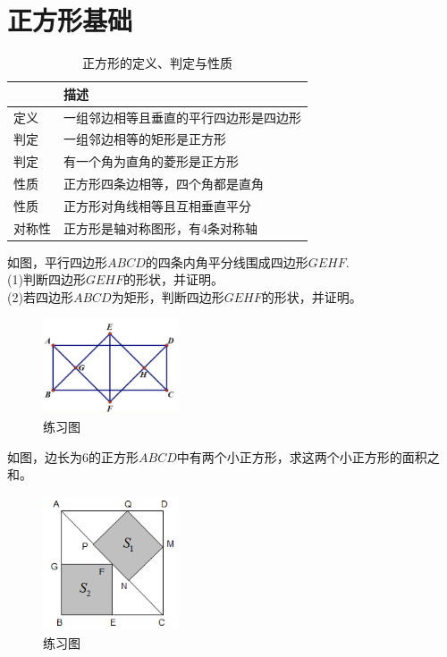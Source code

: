 \documentclass{ecnuthesis}
\begin{document}
\section{正方形基础}
\begin{table}[H]
\centering
\caption{正方形的定义、判定与性质}
\begin{tabular}{|l|l|}
\hline
    & 描述 \\
\hline
定义 & 一组邻边相等且垂直的平行四边形是四边形 \\
\hline
判定 & 一组邻边相等的矩形是正方形 \\
\hline
判定 & 有一个角为直角的菱形是正方形 \\
\hline
性质 & 正方形四条边相等，四个角都是直角 \\
\hline
性质 & 正方形对角线相等且互相垂直平分 \\
\hline
对称性 & 正方形是轴对称图形，有4条对称轴\\
\hline
\end{tabular}
\end{table}
\begin{problem}
    如图，平行四边形$ABCD$的四条内角平分线围成四边形$GEHF$. \\
    (1)判断四边形$GEHF$的形状，并证明。\\
    (2)若四边形$ABCD$为矩形，判断四边形$GEHF$的形状，并证明。\\
\end{problem}
\begin{figure}[H]
\centering
\includegraphics[width=4cm]{picture/6120.png}
\caption{练习图}
\end{figure}
\begin{problem}
    如图，边长为6的正方形$ABCD$中有两个小正方形，求这两个小正方形的面积之和。
\end{problem}
\begin{figure}[H]
\centering
\includegraphics[width=4cm]{picture/644.png}
\caption{练习图}
\end{figure}
\end{document}
